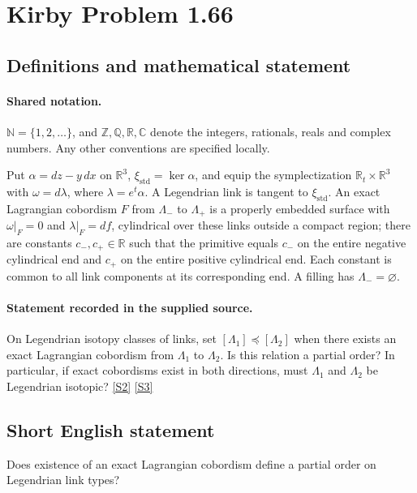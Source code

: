 \documentclass[11pt]{article}
\newcommand{\sref}[2]{\hyperlink{source:#1:#2}{[S#2]}}
\begin{document}
\section{Kirby Problem 1.66}\label{statement}

\subsection{Definitions and mathematical statement}

\paragraph{Shared notation.}$\mathbb N=\{1,2,\ldots\}$, and $\mathbb Z,\mathbb Q,\mathbb R,\mathbb C$ denote the integers, rationals, reals and complex numbers. Any other conventions are specified locally.


Put $\alpha=dz-y\,dx$ on $\mathbb R^3$, $\xi_{\mathrm{std}}=\ker\alpha$, and equip the symplectization $\mathbb R_t\times\mathbb R^3$ with $\omega=d\lambda$, where $\lambda=e^t\alpha$. A Legendrian link is tangent to $\xi_{\mathrm{std}}$. An exact Lagrangian cobordism $F$ from $\Lambda_-$ to $\Lambda_+$ is a properly embedded surface with $\omega|_F=0$ and $\lambda|_F=df$, cylindrical over these links outside a compact region; there are constants $c_-,c_+\in\mathbb R$ such that the primitive equals $c_-$ on the entire negative cylindrical end and $c_+$ on the entire positive cylindrical end. Each constant is common to all link components at its corresponding end. A filling has $\Lambda_-=\varnothing$.
\paragraph{Statement recorded in the supplied source.}
On Legendrian isotopy classes of links, set $[\Lambda_1]\preceq[\Lambda_2]$ when there exists an exact Lagrangian cobordism from $\Lambda_1$ to $\Lambda_2$. Is this relation a partial order? In particular, if exact cobordisms exist in both directions, must $\Lambda_1$ and $\Lambda_2$ be Legendrian isotopic? \sref{statement}{2} \sref{statement}{3}

\subsection{Short English statement}
Does existence of an exact Lagrangian cobordism define a partial order on Legendrian link types?
\end{document}
